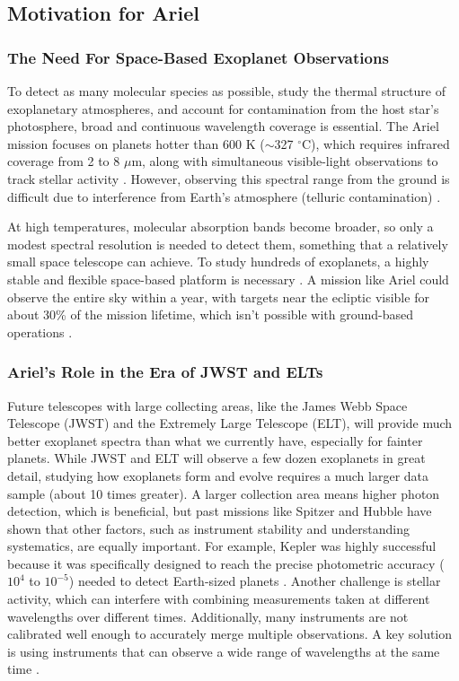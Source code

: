 \documentclass[12pt]{article}
\begin{document}
\subsection{Motivation for Ariel} \label{sec:1.1}

\subsubsection{The Need For Space-Based Exoplanet Observations} \label{sec:1.1.1}

To detect as many molecular species as possible, study the thermal structure of exoplanetary atmospheres, and account for contamination from the host star's photosphere, broad and continuous wavelength coverage is essential.
The Ariel mission focuses on planets hotter than 600 K ($\sim$327 $^{\circ}$C), which requires infrared coverage from 2 to 8 $\mu$m, along with simultaneous visible-light observations to track stellar activity \cite{ARIEL_M4_Proposal}.
However, observing this spectral range from the ground is difficult due to interference from Earth's atmosphere (telluric contamination) \cite{ARIEL_M4_Proposal}.

At high temperatures, molecular absorption bands become broader, so only a modest spectral resolution is needed to detect them, something that a relatively small space telescope can achieve.
To study hundreds of exoplanets, a highly stable and flexible space-based platform is necessary \cite{ARIEL_M4_Proposal}. A mission like Ariel could observe the entire sky within a year, with targets near the ecliptic visible for about 30\%
of the mission lifetime, which isn't possible with ground-based operations \cite{ARIEL_M4_Proposal}.

\subsubsection{Ariel's Role in the Era of JWST and ELTs} \label{sec:1.1.2}

Future telescopes with large collecting areas, like the James Webb Space Telescope (JWST) and the Extremely Large Telescope (ELT), will provide much better exoplanet spectra than what we currently have, especially for fainter planets. While JWST and ELT will observe a few dozen exoplanets in great detail,
studying how exoplanets form and evolve requires a much larger data sample (about 10 times greater). A larger collection area means higher photon detection, which is beneficial, but past missions like Spitzer and Hubble have shown that other factors, such as instrument stability and understanding systematics, are equally important.
For example, Kepler was highly successful because it was specifically designed to reach the precise photometric accuracy ($10^{4}$ to $10^{-5}$) needed to detect Earth-sized planets \cite{kondo2001kepler}. 
Another challenge is stellar activity, which can interfere with combining measurements taken at different wavelengths over different times. Additionally, many instruments are not calibrated well enough to accurately merge multiple observations. A key solution is using instruments that can observe a wide range of wavelengths at the same time \cite{ARIEL_M4_Proposal}.
\end{document}
